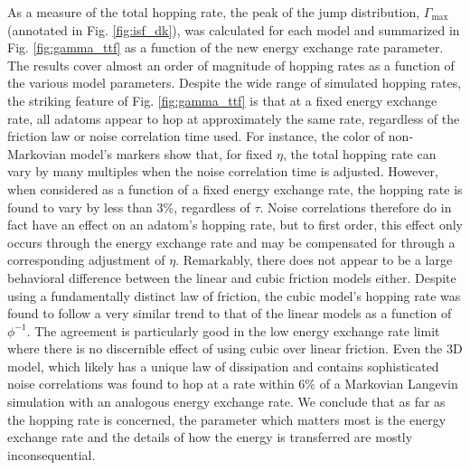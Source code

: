 \documentclass[7pt]{article}
\begin{document}
As a measure of the total hopping rate, the peak of the jump distribution, $\Gamma_{\text{max}}$ (annotated in Fig. \ref{fig:isf_dk}), was calculated for each model and summarized in Fig. \ref{fig:gamma_ttf} as a function of the new energy exchange rate parameter. The results cover almost an order of magnitude of hopping rates as a function of the various model parameters. Despite the wide range of simulated hopping rates, the striking feature of Fig. \ref{fig:gamma_ttf} is that at a fixed energy exchange rate, all adatoms appear to hop at approximately the same rate, regardless of the friction law or noise correlation time used. For instance, the color of non-Markovian model's markers show that, for fixed $\eta$, the total hopping rate can vary by many multiples when the noise correlation time is adjusted. However, when considered as a function of a fixed energy exchange rate, the hopping rate is found to vary by less than $3$\%, regardless of $\tau$. Noise correlations therefore do in fact have an effect on an adatom's hopping rate, but to first order, this effect only occurs through the energy exchange rate and may be compensated for through a corresponding adjustment of $\eta$. Remarkably, there does not appear to be a large behavioral difference between the linear and cubic friction models either. Despite using a fundamentally distinct law of friction, the cubic model's hopping rate was found to follow a very similar trend to that of the linear models as a function of $\phi^{-1}$. The agreement is particularly good in the low energy exchange rate limit where there is no discernible effect of using cubic over linear friction. Even the 3D model, which likely has a unique law of dissipation and contains sophisticated noise correlations was found to hop at a rate within $6$\% of a Markovian Langevin simulation with an analogous energy exchange rate. We conclude that as far as the hopping rate is concerned, the parameter which matters most is the energy exchange rate and the details of how the energy is transferred are mostly inconsequential. 
\end{document}
